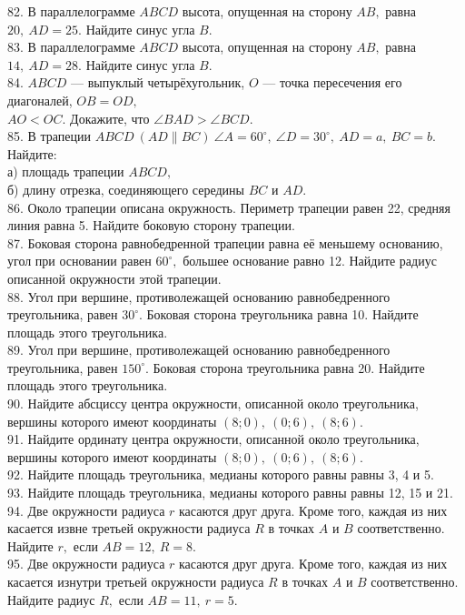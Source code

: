 82. В параллелограмме $ABCD$ высота, опущенная на сторону $AB,$ равна $20,\ AD=25.$ Найдите синус угла $B.$\\
83. В параллелограмме $ABCD$ высота, опущенная на сторону $AB,$ равна $14,\ AD=28.$ Найдите синус угла $B.$\\
84. $ABCD$ --- выпуклый четырёхугольник, $O$ --- точка пересечения его диагоналей, $OB=OD,$\\$AO<OC.$ Докажите, что $\angle BAD>\angle BCD.$\\
85. В трапеции $ABCD\ (AD\parallel BC)\ \angle A=60^\circ,\ \angle D=30^\circ,\ AD=a,\ BC=b.$ Найдите:\\
а) площадь трапеции $ABCD,$\\
б) длину отрезка, соединяющего середины $BC$ и $AD.$\\
86. Около трапеции описана окружность. Периметр трапеции равен 22, средняя линия равна 5. Найдите боковую сторону трапеции.\\
87. Боковая сторона равнобедренной трапеции равна её меньшему основанию, угол при основании равен $60^\circ,$ большее основание равно 12. Найдите радиус описанной окружности этой трапеции.\\
88. Угол при вершине, противолежащей основанию равнобедренного треугольника, равен $30^\circ.$ Боковая сторона треугольника равна 10. Найдите площадь этого треугольника.\\
89. Угол при вершине, противолежащей основанию равнобедренного треугольника, равен $150^\circ.$ Боковая сторона треугольника равна 20. Найдите площадь этого треугольника.\\
90. Найдите абсциссу центра окружности, описанной около треугольника, вершины которого имеют координаты $(8;0),\ (0;6),\ (8;6).$\\
91. Найдите ординату центра окружности, описанной около треугольника, вершины которого имеют координаты $(8;0),\ (0;6),\ (8;6).$\\
92. Найдите площадь треугольника, медианы которого равны равны 3, 4 и 5.\\
93. Найдите площадь треугольника, медианы которого равны равны 12, 15 и 21.\\
94. Две окружности радиуса $r$ касаются друг друга. Кроме того, каждая из них касается извне третьей окружности радиуса $R$ в точках $A$ и $B$ соответственно. Найдите  $r,$ если $AB=12,\ R=8.$\\
95. Две окружности радиуса $r$ касаются друг друга. Кроме того, каждая из них касается изнутри третьей окружности радиуса $R$ в точках $A$ и $B$ соответственно. Найдите радиус $R,$ если $AB=11,\ r=5.$\\
